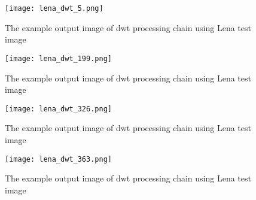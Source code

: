 \begin{figure}
    \centering
    \texttt{[image: lena\_dwt\_5.png]}
    \caption{The example output image of dwt processing chain using Lena test image \cite{lena}}
    \label{fig:lena_dwt_5}
\end{figure}

\begin{figure}
    \centering
    \texttt{[image: lena\_dwt\_199.png]}
    \caption{The example output image of dwt processing chain using Lena test image \cite{lena}}
    \label{fig:lena_dwt_199}
\end{figure}

\begin{figure}
    \centering
    \texttt{[image: lena\_dwt\_326.png]}
    \caption{The example output image of dwt processing chain using Lena test image \cite{lena}}
    \label{fig:lena_dwt_326}
\end{figure}

\begin{figure}
    \centering
    \texttt{[image: lena\_dwt\_363.png]}
    \caption{The example output image of dwt processing chain using Lena test image \cite{lena}}
    \label{fig:lena_dwt_363}
\end{figure}
